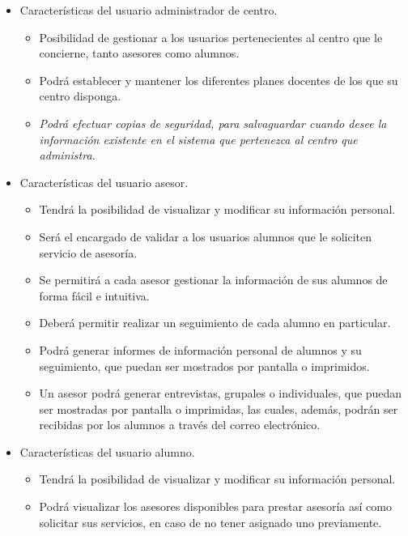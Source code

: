 \begin{itemize}
   \item Características del usuario administrador de centro.
      \begin{itemize}
       \item Posibilidad de gestionar a los usuarios pertenecientes al centro
             que le concierne, tanto asesores como alumnos.
       \item Podrá establecer y mantener los diferentes planes docentes de los
             que su centro disponga.
       \item \textit{Podrá efectuar copias de seguridad, para salvaguardar cuando
             desee la información existente en el sistema que pertenezca al
             centro que administra.}
      \end{itemize}


   \item Características del usuario asesor.
      \begin{itemize}
         \item Tendrá la posibilidad de visualizar y modificar su información
         personal.
         \item Será el encargado de validar a los usuarios alumnos que le
         soliciten servicio de asesoría.
         \item Se permitirá a cada asesor gestionar la información de sus
         alumnos de forma fácil e intuitiva.
         \item Deberá permitir realizar un seguimiento de cada alumno en
         particular.
         \item Podrá generar informes de información personal de alumnos y su
         seguimiento, que puedan ser mostrados por pantalla o imprimidos.
         \item Un asesor podrá generar entrevistas, grupales o individuales, que
         puedan ser mostradas por pantalla o imprimidas, las cuales, además,
         podrán ser recibidas por los alumnos a través del correo electrónico.
      \end{itemize}

   \item Características del usuario alumno.
      \begin{itemize}
         \item Tendrá la posibilidad de visualizar y modificar su información
         personal.
         \item Podrá visualizar los asesores disponibles para prestar asesoría
         así como solicitar sus servicios, en caso de no tener asignado uno
         previamente.
      \end{itemize}
\end{itemize}

